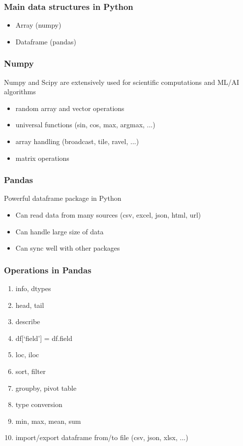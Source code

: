 \documentclass{beamer}
\begin{document}
\begin{frame}
\frametitle{Main data structures in Python}
    \begin{itemize}
        \item Array (numpy)
        \item Dataframe (pandas)
    \end{itemize}
\end{frame}

\begin{frame}
    \frametitle{Numpy}
    Numpy and Scipy are extensively used for scientific computations and ML/AI algorithms
    \begin{itemize}
        \item random array and vector operations
        \item universal functions (sin, cos, max, argmax, ...)
        \item array handling (broadcast, tile, ravel, ...)
        \item matrix operations
    \end{itemize}
\end{frame}


\begin{frame}
    \frametitle{Pandas}
    Powerful dataframe package in Python
        \begin{itemize}
            \item Can read data from many sources (csv, excel, json, html, url)
            \item Can handle large size of data
            \item Can sync well with other packages
        \end{itemize}
\end{frame}

\begin{frame}
    \frametitle{Operations in Pandas}
    \begin{enumerate}
        \item info, dtypes 
        \item head, tail 
        \item describe
        \item df[‘field’] = df.field
        \item loc, iloc
        \item sort, filter
        \item groupby, pivot table
        \item type conversion
        \item min, max, mean, sum
        \item import/export dataframe from/to file (csv, json, xlsx, ...)
    \end{enumerate}
\end{frame}
\end{document}
